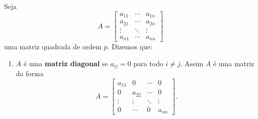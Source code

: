 \begin{definicao}
    Seja
    \[
        A = \begin{bmatrix}
                a_{11} & \cdots & a_{1n}\\
                a_{21} & \cdots & a_{2n}\\
                \vdots & \ddots & \vdots\\
                a_{n1} & \cdots & a_{nn}
            \end{bmatrix}
    \]
    uma matriz quadrada de ordem $p$. Dizemos que:
    \begin{enumerate}
        \item $A$ é uma \textbf{matriz diagonal} se $a_{ij} = 0$ para todo $i \ne j$. Assim $A$ é uma matriz da forma
            \[
                A = \begin{bmatrix}
                    a_{11} & 0 & \cdots & 0\\
                    0 & a_{22} & \cdots & 0\\
                    \vdots & \vdots & \ddots & \vdots\\
                    0 & \cdots & 0 & a_{nn}
                \end{bmatrix}.
            \]


\end{enumerate}
\end{definicao}
